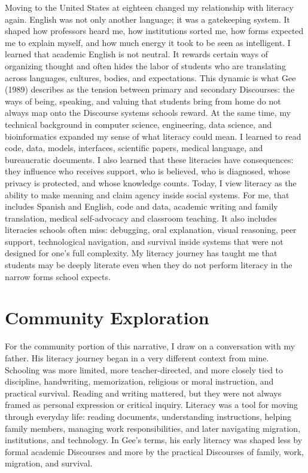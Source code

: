 \documentclass[11pt]{article}
\begin{document}
Moving to the United States at eighteen changed my relationship with literacy again. English was not only another language; it was a gatekeeping system. It shaped how professors heard me, how institutions sorted me, how forms expected me to explain myself, and how much energy it took to be seen as intelligent. I learned that academic English is not neutral. It rewards certain ways of organizing thought and often hides the labor of students who are translating across languages, cultures, bodies, and expectations. This dynamic is what Gee (1989) describes as the tension between primary and secondary Discourses: the ways of being, speaking, and valuing that students bring from home do not always map onto the Discourse systems schools reward. At the same time, my technical background in computer science, engineering, data science, and bioinformatics expanded my sense of what literacy could mean. I learned to read code, data, models, interfaces, scientific papers, medical language, and bureaucratic documents. I also learned that these literacies have consequences: they influence who receives support, who is believed, who is diagnosed, whose privacy is protected, and whose knowledge counts. Today, I view literacy as the ability to make meaning and claim agency inside social systems. For me, that includes Spanish and English, code and data, academic writing and family translation, medical self-advocacy and classroom teaching. It also includes literacies schools often miss: debugging, oral explanation, visual reasoning, peer support, technological navigation, and survival inside systems that were not designed for one's full complexity. My literacy journey has taught me that students may be deeply literate even when they do not perform literacy in the narrow forms school expects.

\section*{Community Exploration}

For the community portion of this narrative, I draw on a conversation with my father. His literacy journey began in a very different context from mine. Schooling was more limited, more teacher-directed, and more closely tied to discipline, handwriting, memorization, religious or moral instruction, and practical survival. Reading and writing mattered, but they were not always framed as personal expression or critical inquiry. Literacy was a tool for moving through everyday life: reading documents, understanding instructions, helping family members, managing work responsibilities, and later navigating migration, institutions, and technology. In Gee's terms, his early literacy was shaped less by formal academic Discourses and more by the practical Discourses of family, work, migration, and survival.
\end{document}
